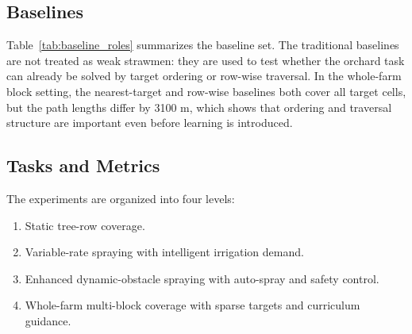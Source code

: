 \documentclass[conference,10pt]{IEEEtran}
\begin{document}
\subsection{Baselines}
Table~\ref{tab:baseline_roles} summarizes the baseline set. The traditional baselines are not treated as weak strawmen: they are used to test whether the orchard task can already be solved by target ordering or row-wise traversal. In the whole-farm block setting, the nearest-target and row-wise baselines both cover all target cells, but the path lengths differ by 3100 m, which shows that ordering and traversal structure are important even before learning is introduced.

\begin{table}[t]
\centering
\caption{Baselines and their role in the study.}
\label{tab:baseline_roles}
\end{table}

\subsection{Tasks and Metrics}
The experiments are organized into four levels:
\begin{enumerate}
  \item Static tree-row coverage.
  \item Variable-rate spraying with intelligent irrigation demand.
  \item Enhanced dynamic-obstacle spraying with auto-spray and safety control.
  \item Whole-farm multi-block coverage with sparse targets and curriculum guidance.
\end{enumerate}
\end{document}
